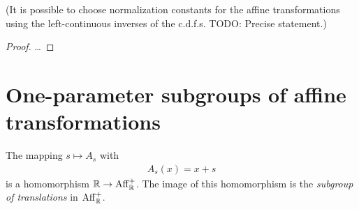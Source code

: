 \begin{lemma}
  \label{lemma:convergence-to-types-normalization}
  (It is possible to choose normalization constants for the affine
  transformations using the left-continuous inverses of the c.d.f.s.
  TODO: Precise statement.)
%
%
\end{lemma}
\begin{proof}
  \ldots
\end{proof}


\section{One-parameter subgroups of affine transformations}

\begin{definition}
  \label{def:translation-subgroup}
  The mapping $s \mapsto A_s$ with
  \begin{align*}
    A_s(x) = x + s
  \end{align*}
  is a homomorphism $\mathbb{R} \to \mathrm{Aff}^+_{\mathbb{R}}$. The image of this
  homomorphism is the \emph{subgroup of translations} in $\mathrm{Aff}^+_{\mathbb{R}}$.
\end{definition}

